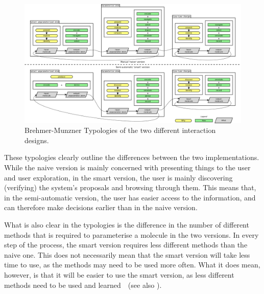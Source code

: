 \begin{figure}
\begin{center}
\includegraphics[width=\textwidth]{img/complete_typology.pdf}
\caption{Brehmer-Munzner Typologies of the two different interaction designs.}
\end{center}
\end{figure}

These typologies clearly outline the differences between the two implementations. While the naive version is mainly concerned with presenting things to the user and user exploration, in the smart version, the user is mainly discovering (verifying) the system's proposals and browsing through them. This means that, in the semi-automatic version, the user has easier access to the information, and can therefore make decisions earlier than in the naive version.

What is also clear in the typologies is the difference in the number of different methods that is required to parameterise a molecule in the two versions. In every step of the process, the smart version requires less different methods than the naive one. This does not necessarily mean that the smart version will take less time to use, as the methods may need to be used more often. What it does mean, however, is that it will be easier to use the smart version, as less different methods need to be used and learned~\cite{sweller1994cognitive}~(see also ).
